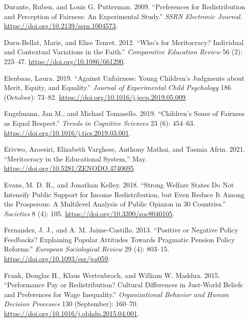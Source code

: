 \documentclass[
  letterpaper,
  DIV=11,
  numbers=noendperiod]{scrartcl}
\newlength{\cslhangindent}
\newlength{\cslentryspacingunit} %
\newenvironment{CSLReferences}[2] %
 {%
  \setlength{\parindent}{0pt}
  \ifodd #1
  \let\oldpar\par
  \def\par{\hangindent=\cslhangindent\oldpar}
  \fi
  \setlength{\parskip}{#2\cslentryspacingunit}
 }%
 {}
\begin{document}
\begin{CSLReferences}{1}{0}
\leavevmode{}%
Durante, Ruben, and Louis G. Putterman. 2009. {``Preferences for
{Redistribution} and {Perception} of {Fairness}: {An Experimental
Study}.''} \emph{SSRN Electronic Journal}.
\url{https://doi.org/10.2139/ssrn.1004573}.

\leavevmode{}%
Duru-Bellat, Marie, and Elise Tenret. 2012. {``Who's for {Meritocracy}?
{Individual} and {Contextual Variations} in the {Faith}.''}
\emph{Comparative Education Review} 56 (2): 223--47.
\url{https://doi.org/10.1086/661290}.

\leavevmode{}%
Elenbaas, Laura. 2019. {``Against Unfairness: {Young} Children's
Judgments about Merit, Equity, and Equality.''} \emph{Journal of
Experimental Child Psychology} 186 (October): 73--82.
\url{https://doi.org/10.1016/j.jecp.2019.05.009}.

\leavevmode{}%
Engelmann, Jan M., and Michael Tomasello. 2019. {``Children's {Sense} of
{Fairness} as {Equal Respect}.''} \emph{Trends in Cognitive Sciences} 23
(6): 454--63. \url{https://doi.org/10.1016/j.tics.2019.03.001}.

\leavevmode{}%
Erivwo, Aroesiri, Elizabeth Varghese, Anthony Mathai, and Tasmia Afrin.
2021. {``Meritocracy in the {Educational System},''} May.
\url{https://doi.org/10.5281/ZENODO.4740695}.

\leavevmode{}%
Evans, M. D. R., and Jonathan Kelley. 2018. {``Strong {Welfare States Do
Not Intensify Public Support} for {Income Redistribution}, but {Even
Reduce It} Among the {Prosperous}: {A Multilevel Analysis} of {Public
Opinion} in 30 {Countries}.''} \emph{Societies} 8 (4): 105.
\url{https://doi.org/10.3390/soc8040105}.

\leavevmode{}%
Fernandez, J. J., and A. M. Jaime-Castillo. 2013. {``Positive or
{Negative Policy Feedbacks}? {Explaining Popular Attitudes Towards
Pragmatic Pension Policy Reforms}.''} \emph{European Sociological
Review} 29 (4): 803--15. \url{https://doi.org/10.1093/esr/jcs059}.

\leavevmode{}%
Frank, Douglas H., Klaus Wertenbroch, and William W. Maddux. 2015.
{``Performance Pay or Redistribution? {Cultural} Differences in
Just-World Beliefs and Preferences for Wage Inequality.''}
\emph{Organizational Behavior and Human Decision Processes} 130
(September): 160--70. \url{https://doi.org/10.1016/j.obhdp.2015.04.001}.


\end{CSLReferences}
\end{document}
